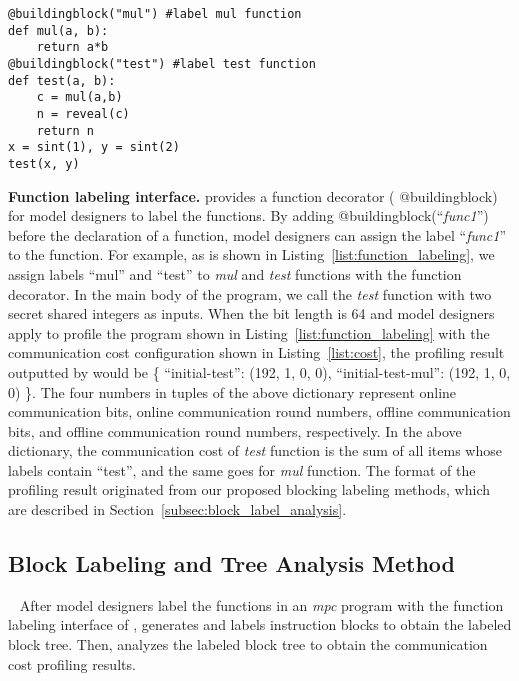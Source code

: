 \begin{lstlisting}[mathescape,xleftmargin=2em,framexleftmargin=2em, caption = {An example program whose functions are labeled using the function labeling interface of \hawkeye.},columns=fullflexible, label = {list:function_labeling}]
@buildingblock("mul") #label mul function
def mul(a, b):
    return a*b   
@buildingblock("test") #label test function
def test(a, b):
    c = mul(a,b)
    n = reveal(c)
    return n
x = sint(1), y = sint(2)
test(x, y)
\end{lstlisting}

\noindent \textbf{Function labeling interface.} \hawkeye provides a function decorator ( @buildingblock) for model designers to label the functions. By adding @buildingblock(``\textit{func1}'') before the declaration of a function, model designers can assign the label ``\textit{func1}'' to the function. For example, as is shown in Listing~\ref{list:function_labeling}, we assign labels ``mul'' and ``test'' to \textit{mul} and \textit{test} functions with the function decorator. In the main body of the program, we call the \textit{test} function with two secret shared integers as inputs. When the bit length is 64 and model designers apply \hawkeye to profile the program shown in Listing~\ref{list:function_labeling} with the communication cost configuration shown in Listing~\ref{list:cost}, the profiling result outputted by \hawkeye would be \{ ``initial-test'': (192, 1, 0, 0), ``initial-test-mul'': (192, 1, 0, 0) \}. The four numbers in tuples of the above dictionary represent online communication bits, online communication round numbers, offline communication bits, and offline communication round numbers, respectively. 
In the above dictionary, the communication cost of \textit{test} function is the sum of all items whose labels contain ``test'', and the same goes for \textit{mul} function. The format of the profiling result originated from our proposed blocking labeling methods, which are described in Section~\ref{subsec:block_label_analysis}.

\subsection{Block Labeling and Tree Analysis Method}~\label{subsec:block_label_analysis}
After model designers label the functions in an \textit{mpc} program with the function labeling interface of \hawkeye, \hawkeye generates and labels instruction blocks to obtain the labeled block tree. Then, \hawkeye analyzes the labeled block tree to obtain the communication cost profiling results. 

